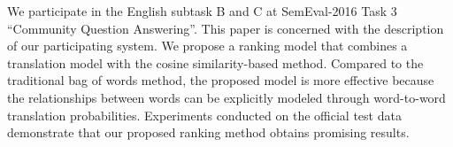 We participate in the English subtask B and C at SemEval-2016 Task 3 ``Community Question Answering''. This paper is concerned with the description of our participating system. We propose a ranking model that combines a translation model with the cosine similarity-based method. Compared to the traditional bag of words method, the proposed model is more effective because the relationships between words can be explicitly modeled through word-to-word translation probabilities. Experiments conducted on the official test data demonstrate that our proposed ranking method obtains promising results.
